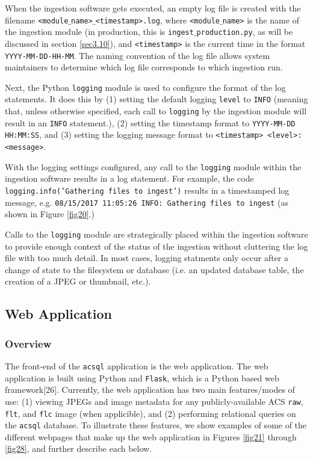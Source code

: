 \documentclass[10pt,journal,compsoc]{IEEEtran}
\begin{document}
When the ingestion software gets executed, an empty log file is created with the filename \texttt{<module$\_$name>$\_$<timestamp>.log}, where \texttt{<module$\_$name>} is the name of the
ingestion module (in production, this is \texttt{ingest$\_$production.py}, as will be discussed in section \ref{sec3.10}), and \texttt{<timestamp>} is the current time in the format
\texttt{YYYY-MM-DD-HH-MM}. The naming convention of the log file allows system maintainers to determine which log file corresponds to which ingestion run.

Next, the Python \texttt{logging} module is used to configure the format of the log statements.  It does this by (1) setting the default logging \texttt{level} to \texttt{INFO} (meaning
that, unless otherwise specified, each call to \texttt{logging} by the ingestion module will result in an \texttt{INFO} statement.), (2) setting the timestamp format to
\texttt{YYYY-MM-DD HH:MM:SS}, and (3) setting the logging message format to \texttt{<timestamp> <level>: <message>}.

With the logging settings configured, any call to the \texttt{logging} module within the ingestion software results in a log statement.  For example, the code
\texttt{logging.info('Gathering files to ingest')} results in a timestamped log message, e.g. \texttt{08/15/2017 11:05:26 INFO: Gathering files to ingest} (as shown in Figure \ref{fig20}.)

Calls to the \texttt{logging} module are strategically placed within the ingestion software to provide enough context of the status of the ingestion without cluttering the log file with
too much detail. In most cases, logging statments only occur after a change of state to the filesystem or database (i.e. an updated database table, the creation of a JPEG or thumbnail, etc.).


\subsection{Web Application} \label{sec3.9}


\subsubsection{Overview}

The front-end of the \texttt{acsql} application is the web application.  The web application is built using Python and \texttt{Flask}, which is a Python based web framework[26].
Currently, the web application has two main features/modes of use: (1) viewing JPEGs and image metadata for any publicly-available ACS \texttt{raw}, \texttt{flt}, and \texttt{flc} image
(when applicible), and (2) performing relational queries on the \texttt{acsql} database.  To illustrate these features, we show examples of some of the different webpages that make up the
web application in Figures \ref{fig21} through \ref{fig28}, and further describe each below.
\end{document}
